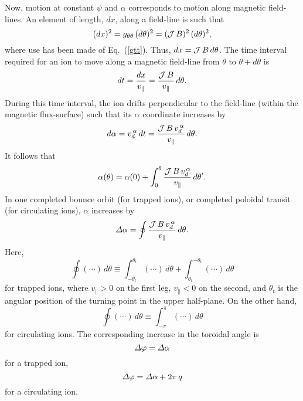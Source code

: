 \documentclass[12pt,prb,aps,notitlepage]{revtex4-1}
\begin{document}
 Now, motion at constant $\psi$ and $\alpha$ corresponds to motion along magnetic field-lines. An element of length, $dx$, along
 a field-line is such that
 \begin{equation}
 (dx)^2 = g_{\theta\theta}\,(d\theta)^2= ({\cal J}\,B)^2\,(d\theta)^2,
 \end{equation}
 where use has been made of Eq.~(\ref{gtt}). Thus, $dx = {\cal J}\,B\,d\theta$. The time interval required for an ion to move along a
 magnetic field-line from  $\theta$ to $\theta+d\theta$ is
 \begin{equation}\label{dt}
 dt = \frac{dx}{v_\parallel} =\frac{{\cal J}\,B}{v_\parallel}\,d\theta.
 \end{equation}
 During this time interval, the ion drifts perpendicular to the field-line (within the magnetic flux-surface) such that its $\alpha$ coordinate
 increases by
 \begin{equation}
 d\alpha =v_d^{\,\alpha}\,dt =\frac{{\cal J}\,B\,v_d^{\,\alpha}}{v_\parallel}\,d\theta.
 \end{equation}
 It follows that
 \begin{equation}
 \alpha(\theta)= \alpha(0) + \int_0^\theta\frac{{\cal J}\,B\,v_d^{\,\alpha}}{v_\parallel}\,d\theta'.
 \end{equation}
  In one completed bounce orbit (for trapped ions), or completed poloidal transit (for circulating ions), $\alpha$ increases by
 \begin{equation}
 {\mit\Delta}\alpha =\oint\frac{{\cal J}\,B\,v_d^{\,\alpha}}{v_\parallel}\,d\theta.
 \end{equation}
 Here, 
 \begin{equation}
 \oint (\cdots)\,d\theta \equiv \int_{-\theta_t}^{\theta_t}(\cdots)\,d\theta+  \int_{\theta_t}^{-\theta_t}(\cdots)\,d\theta
 \end{equation}
 for trapped ions, where $v_\parallel >0$ on the first leg, $v_\parallel<0$ on the second, and $\theta_t$ is the angular position of the turning point in the upper half-plane.
 On the other hand, 
 \begin{equation}
 \oint (\cdots)\,d\theta \equiv  \int_{-\pi}^\pi(\cdots)\,d\theta
 \end{equation}
 for circulating ions.
 The corresponding increase in the toroidal angle is
 \begin{equation}
 {\mit\Delta}\varphi = {\mit\Delta}\alpha
 \end{equation}
 for a trapped ion, 
 \begin{equation}
 {\mit\Delta}\varphi = {\mit\Delta}\alpha+ 2\pi\,q
 \end{equation}
 for a circulating ion. 
 
\end{document}

